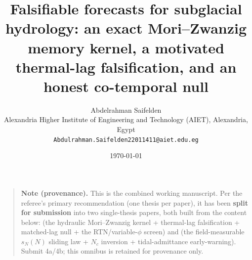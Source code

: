 \documentclass[11pt]{article}
\title{Falsifiable forecasts for subglacial hydrology: an exact Mori–Zwanzig memory kernel, a motivated thermal-lag falsification, and an honest co-temporal null}
\author{Abdelrahman Saifelden\\ Alexandria Higher Institute of Engineering and Technology (AIET), Alexandria, Egypt\\ \texttt{Abdulrahman.Saifelden22011411@aiet.edu.eg}}
\date{\today}
\begin{document}
\maketitle

\begin{quote}
\textbf{Note (provenance).} This is the combined working manuscript. Per the referee's primary recommendation (one thesis per paper), it has been \textbf{split for submission} into two single-thesis papers, both built from the content below:  (the hydraulic Mori–Zwanzig kernel + thermal-lag falsification + matched-lag null + the RTN/variable-$\phi $ screen) and  (the field-measurable $s_{N}(N)$ sliding law + $N_{c}$ inversion + tidal-admittance early-warning). Submit 4a/4b; this omnibus is retained for provenance only.
\end{quote}
\end{document}
